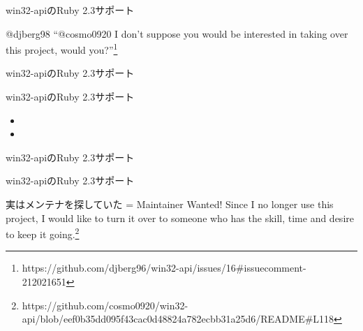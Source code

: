 \documentclass[12pt, unicode]{beamer}
\begin{document}
\begin{frame}{win32-apiのRuby 2.3サポート}
  \Large{
    \begin{block}{}
      @djberg98 ``@cosmo0920 I don't suppose you would be interested in taking over this project, would you?''\footnote[frame]{https://github.com/djberg96/win32-api/issues/16\#issuecomment-212021651}
    \end{block}
  }
\end{frame}

\begin{frame}{win32-apiのRuby 2.3サポート}
  \Large {}
\end{frame}

\begin{frame}{win32-apiのRuby 2.3サポート}
  \Large {
    \begin{block}{}
      \begin{itemize}
      \item {}
      \item {}
      \end{itemize}
    \end{block}
  }
\end{frame}

\begin{frame}{win32-apiのRuby 2.3サポート}
  \Large {
  }
\end{frame}

\begin{frame}{win32-apiのRuby 2.3サポート}
  \begin{block}{実はメンテナを探していた}
= Maintainer Wanted!
Since I no longer use this project, I would like to turn it over to
someone who has the skill, time and desire to keep it going.\footnote[frame]{https://github.com/cosmo0920/win32-api/blob/eef0b35dd095f43cac0d48824a782ecbb31a25d6/README\#L118}\newline
{}
  \end{block}
\end{frame}
\end{document}
